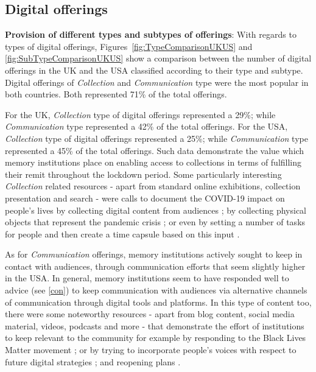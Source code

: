 \documentclass{egpubl}
\begin{document}

\subsection{Digital offerings}
\label{dig}
\noindent \textbf{Provision of different types and subtypes of offerings}:  With regards to types of digital offerings, Figures~\ref{fig:TypeComparisonUKUS} and \ref{fig:SubTypeComparisonUKUS} show a comparison between the number of digital offerings in the UK and the USA classified according to their type and subtype. Digital offerings of \emph{Collection} and \emph{Communication} type were the most popular in both countries. Both represented 71\% of the total offerings. 

For the UK, \emph{Collection} type of digital offerings represented a 29\%; while \emph{Communication} type represented a 42\% of the total offerings. For the USA, \emph{Collection} type of digital offerings represented a 25\%; while \emph{Communication} type represented a 45\% of the total offerings. Such data demonstrate the value which memory institutions place on enabling access to collections in terms of fulfilling their remit throughout the lockdown period. Some particularly interesting \textit{Collection} related resources - apart from standard online exhibitions, collection presentation and search - were calls to document the COVID-19 impact on people's lives by collecting digital content from audiences \cite{NationalPortraitGallery2020,EllaSharpMuseum2020}; by collecting physical objects that represent the pandemic crisis \cite{MuseumsSheffield2020}; or even by setting a number of tasks for people and then create a time capsule based on this input \cite{York2020}.

As for \textit{Communication} offerings, memory institutions actively sought to keep in contact with audiences, through communication efforts that seem slightly higher in the USA. In general, memory institutions seem to have responded well to advice (see \ref{con}) to keep communication with audiences via alternative channels of communication through digital tools and platforms. In this type of content too, there were some noteworthy resources - apart from blog content, social media material, videos, podcasts and more - that demonstrate the effort of institutions to keep relevant to the community for example by responding to the Black Lives Matter movement \cite{Greer2020,Wali2020,Feldman2020}; or by trying to incorporate people's voices with respect to future digital strategies \cite{HistoricAlexandria2020}; and reopening plans \cite{BlackCountryLivingMuseum2020,BristolMuseums2020}. 
\end{document}
